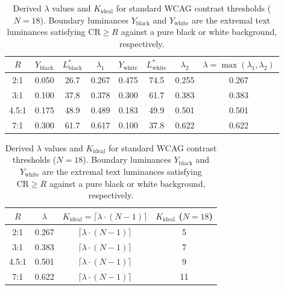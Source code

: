 \begin{table}[t]
\centering
\caption{Derived $\lambda$ values and $K_{\text{ideal}}$ for standard WCAG contrast thresholds ($N = 18$).
Boundary luminances $Y_{\text{black}}$ and $Y_{\text{white}}$ are the extremal text luminances satisfying
$\mathrm{CR} \ge R$ against a pure black or white background, respectively.}
\label{tab:lambda-by-cr}
\begin{tabular}{c c c c c c c c}
\hline
$R$ & $Y_{\text{black}}$ & $L^*_{\text{black}}$ & $\lambda_1$ &
      $Y_{\text{white}}$ & $L^*_{\text{white}}$ & $\lambda_2$ &
      $\lambda = \max(\lambda_1,\lambda_2)$ \\
\hline
2:1   & 0.050 & 26.7 & 0.267 & 0.475 & 74.5 & 0.255 & 0.267 \\
3:1   & 0.100 & 37.8 & 0.378 & 0.300 & 61.7 & 0.383 & 0.383 \\
4.5:1 & 0.175 & 48.9 & 0.489 & 0.183 & 49.9 & 0.501 & 0.501 \\
7:1   & 0.300 & 61.7 & 0.617 & 0.100 & 37.8 & 0.622 & 0.622 \\
\hline
\end{tabular}

\smallskip
\begin{tabular}{c c c c}
\hline
$R$ & $\lambda$ & $K_{\text{ideal}} = \lceil \lambda \cdot (N-1) \rceil$ & $K_{\text{ideal}}$ ($N=18$) \\
\hline
2:1   & 0.267 & $\lceil \lambda \cdot (N-1) \rceil$ & 5  \\
3:1   & 0.383 & $\lceil \lambda \cdot (N-1) \rceil$ & 7  \\
4.5:1 & 0.501 & $\lceil \lambda \cdot (N-1) \rceil$ & 9  \\
7:1   & 0.622 & $\lceil \lambda \cdot (N-1) \rceil$ & 11 \\
\hline
\end{tabular}
\end{table}